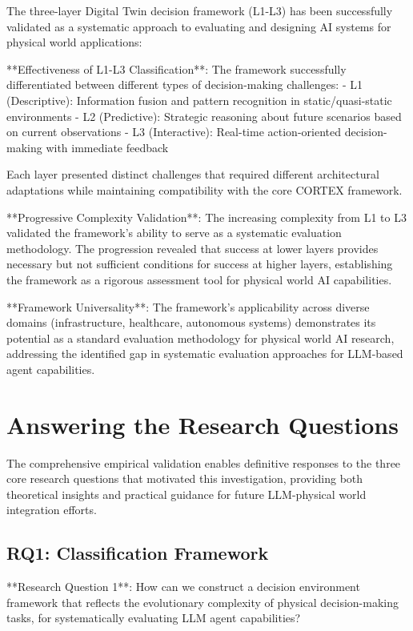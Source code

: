 The three-layer Digital Twin decision framework (L1-L3) has been successfully validated as a systematic approach to evaluating and designing AI systems for physical world applications:

**Effectiveness of L1-L3 Classification**: The framework successfully differentiated between different types of decision-making challenges:
- L1 (Descriptive): Information fusion and pattern recognition in static/quasi-static environments
- L2 (Predictive): Strategic reasoning about future scenarios based on current observations
- L3 (Interactive): Real-time action-oriented decision-making with immediate feedback

Each layer presented distinct challenges that required different architectural adaptations while maintaining compatibility with the core CORTEX framework.

**Progressive Complexity Validation**: The increasing complexity from L1 to L3 validated the framework's ability to serve as a systematic evaluation methodology. The progression revealed that success at lower layers provides necessary but not sufficient conditions for success at higher layers, establishing the framework as a rigorous assessment tool for physical world AI capabilities.

**Framework Universality**: The framework's applicability across diverse domains (infrastructure, healthcare, autonomous systems) demonstrates its potential as a standard evaluation methodology for physical world AI research, addressing the identified gap in systematic evaluation approaches for LLM-based agent capabilities.

\section{Answering the Research Questions}

The comprehensive empirical validation enables definitive responses to the three core research questions that motivated this investigation, providing both theoretical insights and practical guidance for future LLM-physical world integration efforts.

\subsection{RQ1: Classification Framework}

**Research Question 1**: How can we construct a decision environment framework that reflects the evolutionary complexity of physical decision-making tasks, for systematically evaluating LLM agent capabilities?

